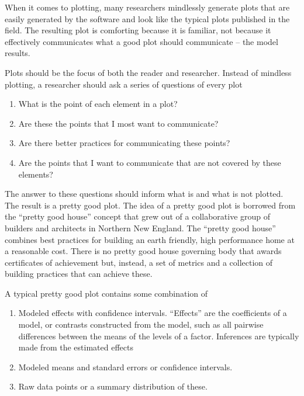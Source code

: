 \documentclass[]{book}
\providecommand{\tightlist}{%
  \setlength{\itemsep}{0pt}\setlength{\parskip}{0pt}}
\begin{document}
When it comes to plotting, many researchers mindlessly generate plots
that are easily generated by the software and look like the typical
plots published in the field. The resulting plot is comforting because
it is familiar, not because it effectively communicates what a good plot
should communicate -- the model results.

Plots should be the focus of both the reader and researcher. Instead of
mindless plotting, a researcher should ask a series of questions of
every plot

\begin{enumerate}
\def\labelenumi{\arabic{enumi}.}
\tightlist
\item
  What is the point of each element in a plot?
\item
  Are these the points that I most want to communicate?
\item
  Are there better practices for communicating these points?
\item
  Are the points that I want to communicate that are not covered by
  these elements?
\end{enumerate}

The answer to these questions should inform what is and what is not
plotted. The result is a pretty good plot. The idea of a pretty good
plot is borrowed from the ``pretty good house'' concept that grew out of
a collaborative group of builders and architects in Northern New
England. The ``pretty good house'' combines best practices for building
an earth friendly, high performance home at a reasonable cost. There is
no pretty good house governing body that awards certificates of
achievement but, instead, a set of metrics and a collection of building
practices that can achieve these.

A typical pretty good plot contains some combination of

\begin{enumerate}
\def\labelenumi{\arabic{enumi}.}
\tightlist
\item
  Modeled effects with confidence intervals. ``Effects'' are the
  coefficients of a model, or contrasts constructed from the model, such
  as all pairwise differences between the means of the levels of a
  factor. Inferences are typically made from the estimated effects
\item
  Modeled means and standard errors or confidence intervals.
\item
  Raw data points or a summary distribution of these.
\end{enumerate}
\end{document}
